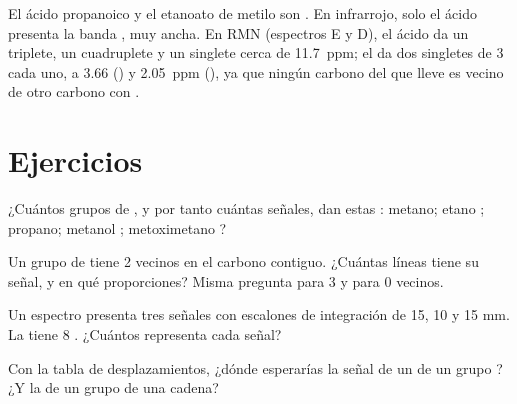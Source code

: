 \begin{example}\label{ex:g12:proton-nmr:isomers}
El ácido propanoico  y el etanoato de metilo
 son . En infrarrojo, solo el ácido presenta la
banda , muy ancha. En RMN (espectros E y D), el ácido da un
triplete, un cuadruplete y un singlete cerca de \qty{11.7}{ppm}; el 
da dos singletes de 3  cada uno, a 3.66 () y
\qty{2.05}{ppm} (), ya que ningún carbono del  que lleve
 es vecino de otro carbono con .
\end{example}

\section{Ejercicios}

\begin{exercise}[$\star$]\label{exo:g12:proton-nmr:1}
¿Cuántos grupos de , y por tanto cuántas señales,
dan estas : metano; etano ; propano; metanol
; metoximetano ?
\end{exercise}

\begin{exercise}[$\star$]\label{exo:g12:proton-nmr:2}
Un grupo de  tiene 2  vecinos en el carbono contiguo.
¿Cuántas líneas tiene su señal, y en qué proporciones? Misma pregunta
para 3 y para 0 vecinos.
\end{exercise}

\begin{exercise}[$\star$]\label{exo:g12:proton-nmr:3}
Un espectro presenta tres señales con escalones de integración de 15, 10
y 15 mm. La  tiene 8 . ¿Cuántos  representa cada
señal?
\end{exercise}

\begin{exercise}[$\star$]\label{exo:g12:proton-nmr:4}
Con la tabla de desplazamientos, ¿dónde esperarías la señal de un 
de un grupo ? ¿Y la de un grupo  de una cadena?
\end{exercise}

